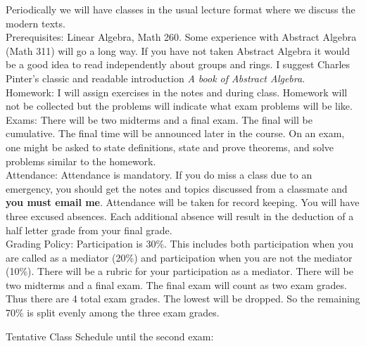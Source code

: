 \documentclass{article}
\begin{document}
	Periodically we will have classes in the usual lecture format where we discuss the modern texts.\\ 
	
	Prerequisites: Linear Algebra, Math 260. Some experience with Abstract Algebra (Math 311) will go a long way. If you have not taken Abstract Algebra it would be a good idea to read independently about groups and rings. I suggest Charles Pinter's classic and readable introduction \textit{A book of Abstract Algebra}. \\ 
	
	Homework: I will assign exercises in the notes and during class. Homework will not be collected but the problems will indicate what exam problems will be like. \\
	
	Exams: There will be two midterms and a final exam. The final will be cumulative. The final time will be announced later in the course. On an exam, one might be asked to state definitions, state and prove theorems, and solve problems similar to the homework.\\
	
	Attendance: Attendance is mandatory. If you do miss a class due to an emergency, you should get the notes and topics discussed from a classmate and \textbf{you must email me}. Attendance will be taken for record keeping. You will have three excused absences. Each additional absence will result in the deduction of a half letter grade from your final grade. \\
	
	Grading Policy: Participation is 30\%. This includes both participation when you are called as a mediator (20\%) and participation when you are not the mediator (10\%). There will be a rubric for your participation as a mediator. There will be two midterms and a final exam. The final exam will count as two exam grades. Thus there are 4 total exam grades. The lowest will be dropped. So the remaining 70\% is split evenly among the three exam grades.\\
	
\begin{center}	Tentative Class Schedule until the second exam: \end{center}
\end{document}
